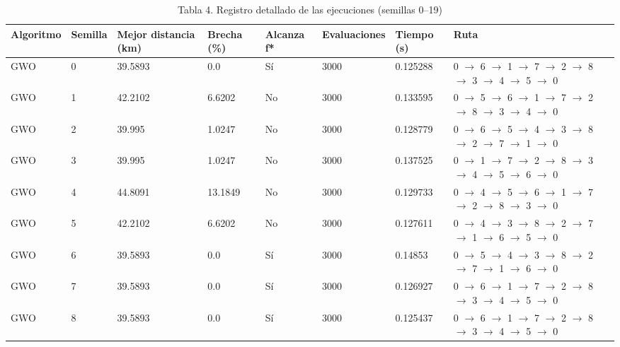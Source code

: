 \begin{table}[htbp]
  \centering
  \caption{Tabla 4. Registro detallado de las ejecuciones (semillas 0–19)}
  \label{tab:tabla-4-ejecuciones-detalladas}
  \begin{tabular}{llllllll}
    \toprule
    Algoritmo & Semilla & Mejor distancia (km) & Brecha (\%) & Alcanza f* & Evaluaciones & Tiempo (s) & Ruta \\
    \midrule
    GWO & 0 & 39.5893 & 0.0 & Sí & 3000 & 0.125288 & 0 $\rightarrow$ 6 $\rightarrow$ 1 $\rightarrow$ 7 $\rightarrow$ 2 $\rightarrow$ 8 $\rightarrow$ 3 $\rightarrow$ 4 $\rightarrow$ 5 $\rightarrow$ 0 \\
    GWO & 1 & 42.2102 & 6.6202 & No & 3000 & 0.133595 & 0 $\rightarrow$ 5 $\rightarrow$ 6 $\rightarrow$ 1 $\rightarrow$ 7 $\rightarrow$ 2 $\rightarrow$ 8 $\rightarrow$ 3 $\rightarrow$ 4 $\rightarrow$ 0 \\
    GWO & 2 & 39.995 & 1.0247 & No & 3000 & 0.128779 & 0 $\rightarrow$ 6 $\rightarrow$ 5 $\rightarrow$ 4 $\rightarrow$ 3 $\rightarrow$ 8 $\rightarrow$ 2 $\rightarrow$ 7 $\rightarrow$ 1 $\rightarrow$ 0 \\
    GWO & 3 & 39.995 & 1.0247 & No & 3000 & 0.137525 & 0 $\rightarrow$ 1 $\rightarrow$ 7 $\rightarrow$ 2 $\rightarrow$ 8 $\rightarrow$ 3 $\rightarrow$ 4 $\rightarrow$ 5 $\rightarrow$ 6 $\rightarrow$ 0 \\
    GWO & 4 & 44.8091 & 13.1849 & No & 3000 & 0.129733 & 0 $\rightarrow$ 4 $\rightarrow$ 5 $\rightarrow$ 6 $\rightarrow$ 1 $\rightarrow$ 7 $\rightarrow$ 2 $\rightarrow$ 8 $\rightarrow$ 3 $\rightarrow$ 0 \\
    GWO & 5 & 42.2102 & 6.6202 & No & 3000 & 0.127611 & 0 $\rightarrow$ 4 $\rightarrow$ 3 $\rightarrow$ 8 $\rightarrow$ 2 $\rightarrow$ 7 $\rightarrow$ 1 $\rightarrow$ 6 $\rightarrow$ 5 $\rightarrow$ 0 \\
    GWO & 6 & 39.5893 & 0.0 & Sí & 3000 & 0.14853 & 0 $\rightarrow$ 5 $\rightarrow$ 4 $\rightarrow$ 3 $\rightarrow$ 8 $\rightarrow$ 2 $\rightarrow$ 7 $\rightarrow$ 1 $\rightarrow$ 6 $\rightarrow$ 0 \\
    GWO & 7 & 39.5893 & 0.0 & Sí & 3000 & 0.126927 & 0 $\rightarrow$ 6 $\rightarrow$ 1 $\rightarrow$ 7 $\rightarrow$ 2 $\rightarrow$ 8 $\rightarrow$ 3 $\rightarrow$ 4 $\rightarrow$ 5 $\rightarrow$ 0 \\
    GWO & 8 & 39.5893 & 0.0 & Sí & 3000 & 0.125437 & 0 $\rightarrow$ 6 $\rightarrow$ 1 $\rightarrow$ 7 $\rightarrow$ 2 $\rightarrow$ 8 $\rightarrow$ 3 $\rightarrow$ 4 $\rightarrow$ 5 $\rightarrow$ 0 \\

\end{tabular}
\end{table}
